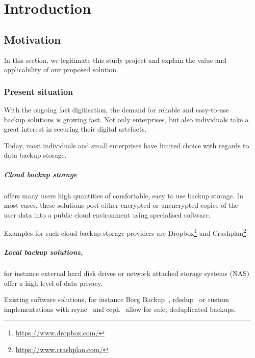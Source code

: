 \chapter{Introduction}
\label{sec:introduction}

\section{Motivation}
In this section, we legitimate this study project and explain the value and applicability of our proposed solution.

\subsection{Present situation}
With the ongoing fast digitisation, the demand for reliable and easy-to-use backup solutions is growing fast. Not only enterprises, but also individuals take a great interest in securing their digital artefacts.

Today, most individuals and small enterprises have limited choice with regards to data backup storage.

\paragraph{Cloud backup storage} offers many users high quantities of comfortable, easy to use backup storage. In most cases, these solutions post either encrypted or unencrypted copies of the user data into a public cloud environment using specialised software.

Examples for such cloud backup storage providers are Dropbox\footnote{\url{https://www.dropbox.com/}} and Crashplan\footnote{\url{https://www.crashplan.com/}}.

\paragraph{Local backup solutions,} for instance external hard disk drives or network attached storage systems (NAS) offer a high level of data privacy. 

Existing software solutions, for instance Borg Backup~\cite{borg-backup}, rdedup~\cite{rdedup} or custom implementations with rsync~\cite{rsync} and ceph~\cite{ceph} allow for safe, deduplicated backups.

